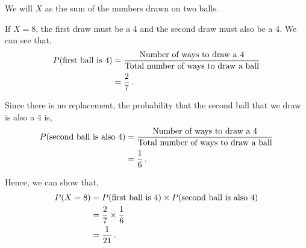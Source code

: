 %
%


\begin{subquestions}
	
\subquestion

We will $X$ as the sum of the numbers drawn on two balls. 

\begin{subsubquestions}
	
\subsubquestion

If $X=8$, the first draw must be a 4 and the second draw must also be a 4. We can see that,
\begin{align}
	P(\text{first ball is 4}) & = \frac{\text{Number of ways to draw a 4}}{\text{Total number of ways to draw a ball}} \nonumber \\
	                          & = \frac{2}{7} \,.
\end{align}

Since there is no replacement, the probability that the second ball that we draw is also a 4 is,
\begin{align}
	P(\text{second ball is also 4}) & = \frac{\text{Number of ways to draw a 4}}{\text{Total number of ways to draw a ball}} \nonumber \\
	                                & = \frac{1}{6} \,.
\end{align}

Hence, we can show that,
\begin{align}
	P(X=8) & = P(\text{first ball is 4}) \times P(\text{second ball is also 4}) \nonumber \\
	       & = \frac{2}{7} \times \frac{1}{6} \nonumber \\
	       & = \frac{1}{21} \,.
\end{align}



\end{subsubquestions}
\end{subquestions}
